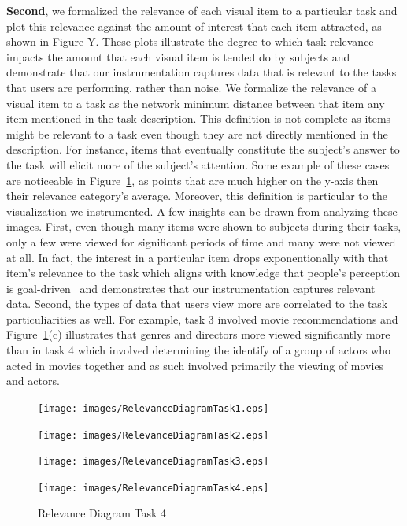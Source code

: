 \textbf{Second}, we formalized the relevance of each visual item to a particular task and plot this relevance against the amount of interest that each item attracted, as shown in Figure Y. These plots illustrate the degree to which task relevance impacts the amount that each visual item is tended do by subjects and demonstrate that our instrumentation captures data that is relevant to the tasks that users are performing, rather than noise. 
We formalize the relevance of a visual item to a task as the network minimum distance between that item any item mentioned in the task description.  This definition is not complete as items might be relevant to a task even though they are not directly mentioned in the description.  For instance, items that eventually constitute the subject's answer to the task will elicit more of the subject's attention. Some example of these cases are noticeable in Figure~\ref{fig:RelevanceDiagram}, as points that are much higher on the y-axis then their relevance category's average. Moreover, this definition is particular to the visualization we instrumented.
A few insights can be drawn from analyzing these images. First, even though many items were shown to subjects during their tasks, only a few were viewed for significant periods of time and many were not viewed at all. In fact, the interest in a particular item drops exponentionally with that item's relevance to the task which aligns with knowledge that people's perception is goal-driven~\cite{something} and demonstrates that our instrumentation captures relevant data.  Second, the types of data that users view more are correlated to the task particuliarities as well. For example, task 3 involved movie recommendations and Figure~\ref{fig:RelevanceDiagram}(c) illustrates that genres and directors more viewed significantly more than in task 4 which involved determining the identify of a group of actors who acted in movies together and as such involved primarily the viewing of movies and actors.  




\begin{figure}[!hbt]
  \centering
  \texttt{[image: images/RelevanceDiagramTask1.eps]}
	\caption*{Relevance Diagram Task 1}
	\texttt{[image: images/RelevanceDiagramTask2.eps]}
	\caption*{Relevance Diagram Task 2}
	\texttt{[image: images/RelevanceDiagramTask3.eps]}
	\caption*{Relevance Diagram Task 3}
	\texttt{[image: images/RelevanceDiagramTask4.eps]}
	\caption*{Relevance Diagram Task 4}
	\label{fig:RelevanceDiagram}
\end{figure}


